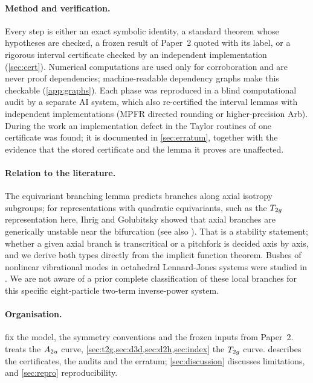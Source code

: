 \paragraph{Method and verification.} Every step is either an exact symbolic identity, a standard theorem whose
hypotheses are checked, a frozen result of Paper~2 quoted with its label, or a rigorous interval certificate checked
by an independent implementation (\cref{sec:cert}). Numerical computations are used only for corroboration and are
never proof dependencies; machine-readable dependency graphs make this checkable (\cref{app:graphs}). Each phase was
reproduced in a blind computational audit by a separate AI system, which also re-certified the interval lemmas with
independent implementations (MPFR directed rounding or higher-precision Arb). During the work an implementation defect in the Taylor routines of one
certificate was found; it is documented in \cref{sec:erratum}, together with the evidence that the stored certificate
and the lemma it proves are unaffected.

\paragraph{Relation to the literature.} The equivariant branching lemma \citep{Cicogna1981,GolubitskyStewartSchaeffer1988}
predicts branches along axial isotropy subgroups; for representations with quadratic equivariants, such as the
$T_{2g}$ representation here, Ihrig and Golubitsky \citep{IhrigGolubitsky1984} showed that axial branches are
generically unstable near the bifurcation (see also \citep{ArjevaniField2022}). That is a stability statement; whether
a given axial branch is transcritical or a pitchfork is decided axis by axis, and we derive both types directly from
the implicit function theorem. Bushes of nonlinear vibrational modes in octahedral Lennard-Jones systems were studied
in \citep{Chechin2003}. We are not aware of a prior complete classification of these local branches for this
specific eight-particle two-term inverse-power system.

\paragraph{Organisation.}  fix the model, the symmetry conventions and the
frozen inputs from Paper~2.  treats the $A_{2u}$ curve, \cref{sec:t2g,sec:d3d,sec:d2h,sec:index} the
$T_{2g}$ curve.  describes the certificates, the audits and the erratum; \cref{sec:discussion} discusses
limitations, and \cref{sec:repro} reproducibility.
